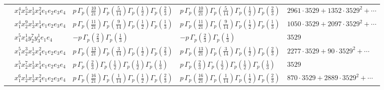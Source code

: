 \documentclass[11pt]{article}
\begin{document}
\begin{table}[ht]
{\begin{tabular}{@{}lllll@{}}
 & $x_{1}^{4} x_{2}^{5} x_{3}^{1} x_{4}^{2}  e_{1} e_{2} e_{3} e_{4}$ & $p \, \Gamma_p \left( \frac{10}{21} \right) \Gamma_p \left( \frac{5}{14} \right) \Gamma_p \left( \frac{1}{2} \right) \Gamma_p \left( \frac{2}{3} \right)$ & $p \, \Gamma_p \left( \frac{10}{21} \right) \Gamma_p \left( \frac{5}{14} \right) \Gamma_p \left( \frac{1}{2} \right) \Gamma_p \left( \frac{2}{3} \right)$ & $2961{\cdot}3529{+}1352{\cdot}3529^{2}{+}\cdots$ \\
 & $x_{1}^{4} x_{2}^{9} x_{3}^{1} x_{4}^{1}  e_{1} e_{2} e_{3} e_{4}$ & $p \, \Gamma_p \left( \frac{11}{21} \right) \Gamma_p \left( \frac{9}{14} \right) \Gamma_p \left( \frac{1}{2} \right) \Gamma_p \left( \frac{1}{3} \right)$ & $p \, \Gamma_p \left( \frac{11}{21} \right) \Gamma_p \left( \frac{9}{14} \right) \Gamma_p \left( \frac{1}{2} \right) \Gamma_p \left( \frac{1}{3} \right)$ & $1050{\cdot}3529{+}2097{\cdot}3529^{2}{+}\cdots$ \\
 & $x_{1}^{5} x_{4}^{1} y_{2}^{7} y_{3}^{1} e_{1} e_{4}$ & $- p \, \Gamma_p \left( \frac{2}{3} \right) \Gamma_p \left( \frac{1}{3} \right)$ & $- p \, \Gamma_p \left( \frac{2}{3} \right) \Gamma_p \left( \frac{1}{3} \right)$ & $3529$ \\
 & $x_{1}^{5} x_{2}^{3} x_{3}^{1} x_{4}^{2}  e_{1} e_{2} e_{3} e_{4}$ & $p \, \Gamma_p \left( \frac{13}{21} \right) \Gamma_p \left( \frac{3}{14} \right) \Gamma_p \left( \frac{1}{2} \right) \Gamma_p \left( \frac{2}{3} \right)$ & $p \, \Gamma_p \left( \frac{13}{21} \right) \Gamma_p \left( \frac{3}{14} \right) \Gamma_p \left( \frac{1}{2} \right) \Gamma_p \left( \frac{2}{3} \right)$ & $2277{\cdot}3529{+}90{\cdot}3529^{2}{+}\cdots$ \\
 & $x_{1}^{5} x_{2}^{7} x_{3}^{1} x_{4}^{1}  e_{1} e_{2} e_{3} e_{4}$ & $p \, \Gamma_p \left( \frac{2}{3} \right) \Gamma_p \left( \frac{1}{2} \right) \Gamma_p \left( \frac{1}{2} \right) \Gamma_p \left( \frac{1}{3} \right)$ & $p \, \Gamma_p \left( \frac{2}{3} \right) \Gamma_p \left( \frac{1}{2} \right) \Gamma_p \left( \frac{1}{2} \right) \Gamma_p \left( \frac{1}{3} \right)$ & $3529$ \\
 & $x_{1}^{6} x_{2}^{1} x_{3}^{1} x_{4}^{2}  e_{1} e_{2} e_{3} e_{4}$ & $p \, \Gamma_p \left( \frac{16}{21} \right) \Gamma_p \left( \frac{1}{14} \right) \Gamma_p \left( \frac{1}{2} \right) \Gamma_p \left( \frac{2}{3} \right)$ & $p \, \Gamma_p \left( \frac{16}{21} \right) \Gamma_p \left( \frac{1}{14} \right) \Gamma_p \left( \frac{1}{2} \right) \Gamma_p \left( \frac{2}{3} \right)$ & $870{\cdot}3529{+}2889{\cdot}3529^{2}{+}\cdots$ \\

\end{tabular}}
\end{table}
\end{document}
